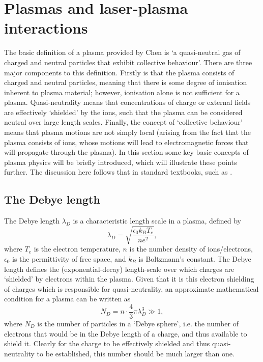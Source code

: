 \section{Plasmas and laser-plasma interactions}
The basic definition of a plasma provided by Chen \cite{Chen2016} is `a quasi-neutral gas of charged and neutral particles that exhibit collective behaviour'. There are three major components to this definition. Firstly is that the plasma consists of charged and neutral particles, meaning that there is some degree of ionisation inherent to plasma material; however, ionisation alone is not sufficient for a plasma. Quasi-neutrality means that  concentrations of charge or external fields are effectively `shielded' by the ions, such that the plasma can be considered neutral over large length scales. Finally, the concept of `collective behaviour' means that plasma motions are not simply local (arising from the fact that the plasma consists of ions, whose motions will lead to electromagnetic forces that will propagate through the plasma). In this section some key basic concepts of plasma physics will be briefly introduced, which will illustrate these points further. The discussion here follows that in standard textbooks, such as \cite{Chen2016}.

\subsection{The Debye length}
The Debye length $\lambda_D$ is a characteristic length scale in a plasma, defined by
\begin{equation} \lambda_D = \sqrt{ \frac{\epsilon_0 k_B T_e}{n e^2}}, \end{equation}
where $T_e$ is the electron temperature, $n$ is the number density of ions/electrons, $\epsilon_0$ is the permittivity of free space, and $k_B$ is Boltzmann's constant. The Debye length defines the (exponential-decay) length-scale over which charges are `shielded' by electrons within the plasma. Given that it is this electron shielding of charges which is responsible for quasi-neutrality, an approximate mathematical condition for a plasma can be written as 
\begin{equation} N_D = n \cdot \frac{4}{3} \pi \lambda_D^3 \gg 1, \end{equation}
where $N_D$ is the number of particles in a `Debye sphere', i.e. the number of electrons that would be in the Debye length of a charge, and thus available to shield it. Clearly for the charge to be effectively shielded and thus quasi-neutrality to be established, this number should be much larger than one.

